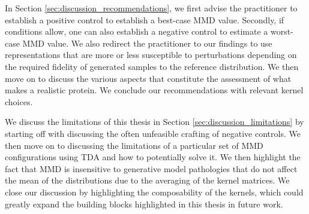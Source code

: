In Section \ref{sec:discussion_recommendations}, we first advise the
practitioner to establish a positive control to establish a best-case MMD value.
Secondly, if conditions allow, one can also establish a negative control to
estimate a worst-case MMD value. We also redirect the practitioner to our
findings to use representations that are more or less susceptible to
perturbations depending on the required fidelity of generated samples to the
reference distribution. We then move on to discuss the various aspects that
constitute the assessment of what makes a realistic protein. We conclude our
recommendations with relevant kernel choices.

We discuss the limitations of this thesis in Section
\ref{sec:discussion_limitations} by starting off with discussing the often
unfeasible crafting of negative controls. We then move on to discussing the
limitations of a particular set of MMD configurations using TDA and how to
potentially solve it. We then highlight the fact that MMD is insensitive to
generative model pathologies that do not affect the mean of the distributions
due to the averaging of the kernel matrices. We close our discussion by
highlighting the composability of the kernels, which could greatly expand the
building blocks highlighted in this thesis in future work.
